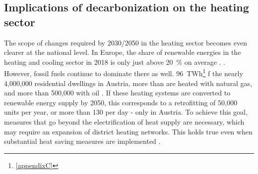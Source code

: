 \subsection{Implications of decarbonization on the heating sector}
The scope of changes required by 2030/2050 in the heating sector becomes even clearer at the national level. In Europe, the share of renewable energies in the heating and cooling sector in 2018 is only just above \SI{20}{\%} on average \cite{eurostat_reference}. . However, fossil fuels continue to dominate there as well.  \SI{96}{TWh}\footnote{\ref{appendixC} } f the nearly 4,000,000 residential dwellings in Austria, more than  are heated with natural gas, and more than 500,000 with oil \cite{statistik_austria}. If these heating systems are converted to renewable energy supply by 2050, this corresponds to a retrofitting of 50,000 units per year, or more than 130 per day - only in Austria. To achieve this goal, measures that go beyond the electrification of heat supply are necessary, which may require an expansion of district heating networks. This holds true even when substantial heat saving measures are implemented \cite{jalil2018spatially}.\vspace{0.3cm}

